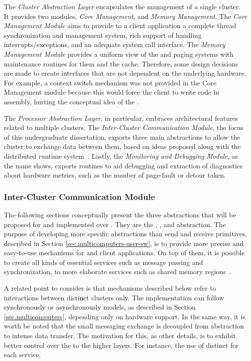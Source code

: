 		The \textit{Cluster Abstraction Layer} encapsulates the management of a single cluster.
		It provides two modules, \textit{Core Management}, and \textit{Memory Management}.
		The \textit{Core Management Module} aims to provide to a client application a complete
		thread synchronization and management system, rich support of handling
		interrupts/exceptions, and an adequate system call interface.
		The \textit{Memory Management Module} provides a uniform view of the \tlbs
		and paging systems with maintenance routines for them and the cache.
		Therefore, some design decisions are made to create interfaces that are not
		dependent on the underlying hardware.
		For example, a context switch mechanism was not provided in the
		Core Management module because this would force the client \os
		to write code in assembly, hurting the conceptual idea of the \hal.

		The \textit{Processor Abstraction Layer}, in particular, embraces
		architectural features related to multiple clusters.
		The \textit{Inter-Cluster Communication Module}, the focus of
		this undergraduate dissertation, exports three main abstractions to allow the
		cluster to exchange data between them, based on ideas proposed along with the
		\nodeos distributed runtime system~\cite{DeDinechin2013-1}.
		Lastly, the \textit{Monitoring and Debugging Module}, as the
		name shows, exports routines to aid debugging and extraction
		of diagnostics about hardware metrics, such as the number of
		page-fault or detour taken.

		\subsubsection{Inter-Cluster Communication Module}
		\label{sec.inter-cluster-communication}

			The following sections conceptually present the three abstractions
			that will be proposed for \hal and implemented over \mppa.
			They are the \sync, \mailbox, and \portal abstraction.
			The purpose of developing more specific abstractions than
			send and receive primitives, described in Section \ref{sec.multicomputers-user-sw},
			is to provide more precise and easy-to-use mechanisms for
			\os and client applications.
			On top of them, it is possible to create all kinds of essential
			services such as message passing and synchronization,
			to more elaborate services such as shared memory regions~\cite{penna:rmen}.

			A related point to consider is that mechanisms described below refer
			to interactions between distinct clusters only.
			The implementation can follow synchronously or asynchronously models,
			as described in Section \ref{sec.multicomputers}, depending only on hardware support.
			In the same way, it is worth be noted that the small messaging exchange
			is decoupled from abstraction to intense data transfer.
			The motivation for this, as other details, is to exhibit better control
			over the \qos to the higher layers.
			For instance, the use of distinct \nocs for each service.

